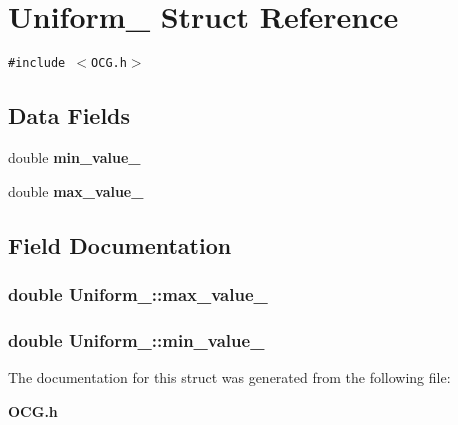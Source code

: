 \section{Uniform\_\- Struct Reference}
\label{structUniform__}
{\tt \#include $<$OCG.h$>$}

\subsection*{Data Fields}
\begin{CompactItemize}
\item 
double {\bf min\_\-value\_\-}
\item 
double {\bf max\_\-value\_\-}
\end{CompactItemize}


\subsection{Field Documentation}
\subsubsection[{max\_\-value\_\-}]{\setlength{\rightskip}{0pt plus 5cm}double {\bf Uniform\_\-::max\_\-value\_\-}}\label{structUniform___1022f8a56d3904a8fa0be39d98fd8f3b}


\subsubsection[{min\_\-value\_\-}]{\setlength{\rightskip}{0pt plus 5cm}double {\bf Uniform\_\-::min\_\-value\_\-}}\label{structUniform___8e82db240694861da79a1db6b0d85a7f}




The documentation for this struct was generated from the following file:\begin{CompactItemize}
\item 
{\bf OCG.h}\end{CompactItemize}
